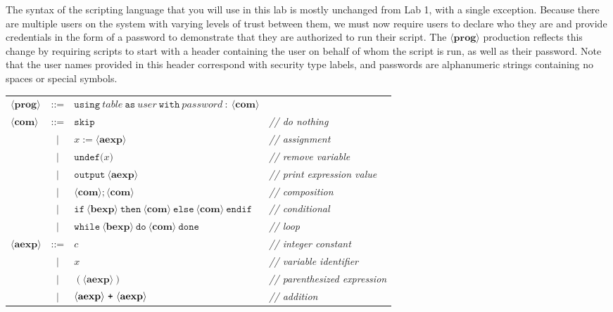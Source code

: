 \documentclass[11pt]{article}
\begin{document}
{The syntax of the scripting language that you will use in this lab is mostly unchanged from Lab 1, with a single exception. 
Because there are multiple users on the system with varying levels of trust between them, we must now require users to 
declare who they are and provide credentials in the form of a password to demonstrate that they are authorized to run 
their script. The $\langle\mathbf{prog}\rangle$ production reflects this change by requiring scripts to start with a 
header containing the user on behalf of whom the script is run, as well as their password. Note that the user names 
provided in this header correspond with security type labels, and passwords are alphanumeric strings containing no
 spaces or special symbols.

\begin{center}
\begin{tabular}{lcll}
$\langle\mathbf{prog}\rangle$ & ::= & $\mathtt{using}~\mathit{table}~\mathtt{as}~\mathit{user}~\mathtt{with}~\mathit{password}~\mathtt{:}~\langle\mathbf{com}\rangle$ &
\\
$\langle\mathbf{com}\rangle$ & ::= & $\mathtt{skip}$ & \textit{// do nothing}
\\
& $\mid$ & $x := \langle\mathbf{aexp}\rangle$ & \textit{// assignment}
\\
& $\mid$ & $\mathtt{undef(}x\mathtt{)}$ & \textit{// remove variable}
\\
& $\mid$ & $\mathtt{output}~\langle\mathbf{aexp}\rangle$ & \textit{// print expression value}
\\
& $\mid$ & $\langle\mathbf{com}\rangle\mathtt{;}\langle\mathbf{com}\rangle$ & \textit{// composition}
\\
& $\mid$ & $\mathtt{if}~\langle\mathbf{bexp}\rangle~\mathtt{then}~\langle\mathbf{com}\rangle~\mathtt{else}~\langle\mathbf{com}\rangle~\mathtt{endif}$
 & \textit{// conditional}
\\
& $\mid$ & $\mathtt{while}~\langle\mathbf{bexp}\rangle~\mathtt{do}~\langle\mathbf{com}\rangle~\mathtt{done}$ & \textit{// loop}
\\
$\langle\mathbf{aexp}\rangle$ & ::= & $c$ & \textit{// integer constant}
\\
& $\mid$ & $x$ &  \textit{// variable identifier}
\\
& $\mid$ & $(\langle\mathbf{aexp}\rangle)$ &   \textit{// parenthesized expression}
\\
& $\mid$ & $\langle\mathbf{aexp}\rangle~\text{\texttt{+}}~\langle\mathbf{aexp}\rangle$ & \textit{// addition}
\\

\end{tabular}
\end{center}}
\end{document}
